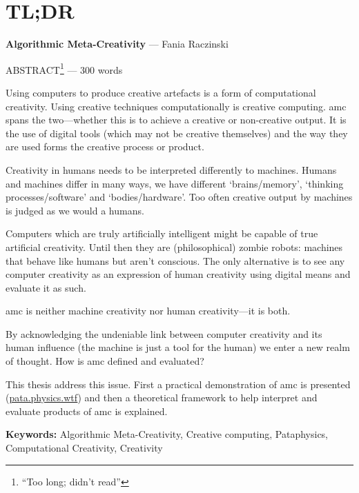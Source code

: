 
\pagestyle{empty}

\chapter{TL;DR}
\label{abstract}

{\Large \textbf{Algorithmic Meta-Creativity}} --- Fania Raczinski

\vspace{0.5cm}
ABSTRACT\footnote{``Too long; didn't read''} --- 300 words

\begin{draft}
  Using computers to produce creative artefacts is a form of computational creativity. Using creative techniques computationally is creative computing. \gls{amc} spans the two---whether this is to achieve a creative or non-creative output. It is the use of digital tools (which may not be creative themselves) and the way they are used forms the creative process or product. 

  Creativity in humans needs to be interpreted differently to machines. Humans and machines differ in many ways, we have different `brains/memory', `thinking processes/software' and `bodies/hardware'. Too often creative output by machines is judged as we would a humans. 

  Computers which are truly artificially intelligent might be capable of true artificial creativity. Until then they are (philosophical) zombie robots: machines that behave like humans but aren't conscious. The only alternative is to see any computer creativity as an expression of human creativity using digital means and evaluate it as such.

  \gls{amc} is neither machine creativity nor human creativity---it is both.

  By acknowledging the undeniable link between computer creativity and its human influence (the machine is just a tool for the human) we enter a new realm of thought. How is \gls{amc} defined and evaluated?

  This thesis address this issue. First a practical demonstration of \gls{amc} is presented (\url{pata.physics.wtf}) and then a theoretical framework to help interpret and evaluate products of \gls{amc} is explained.
\end{draft}

\textbf{Keywords:} Algorithmic Meta-Creativity, Creative computing, Pataphysics, Computational Creativity, Creativity

\clearpage
